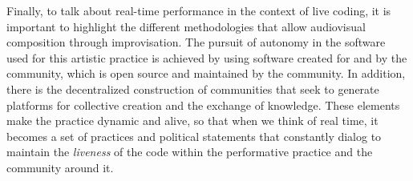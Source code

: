 \documentclass[12pt, twoside, a4paper]{report}
\begin{document}
Finally, to talk about real-time performance in the context of live coding, it is important to highlight the different methodologies that allow audiovisual composition through improvisation. The pursuit of autonomy in the software used for this artistic practice is achieved by using software created for and by the community, which is open source and maintained by the community. In addition, there is the decentralized construction of communities that seek to generate platforms for collective creation and the exchange of knowledge. These elements make the practice dynamic and alive, so that when we think of real time, it becomes a set of practices and political statements that constantly dialog to maintain the \textit{liveness} of the code within the performative practice and the community around it.












%


\end{document}
